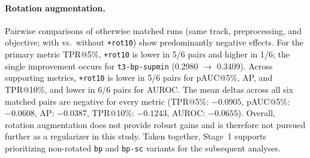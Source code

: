 \paragraph{Rotation augmentation.}
Pairwise comparisons of otherwise matched runs (same track, preprocessing, and objective; with vs.\ without \texttt{+rot10}) show predominantly negative effects.
For the primary metric TPR@5\%, \texttt{+rot10} is lower in 5/6 pairs and higher in 1/6; the single improvement occurs for \texttt{t3-bp-supmin} (0.2980 $\rightarrow$ 0.3409).
Across supporting metrics, \texttt{+rot10} is lower in 5/6 pairs for pAUC@5\%, AP, and TPR@10\%, and lower in 6/6 pairs for AUROC.
The mean deltas across all six matched pairs are negative for every metric (TPR@5\%: $-0.0905$, pAUC@5\%: $-0.0608$, AP: $-0.0387$, TPR@10\%: $-0.1243$, AUROC: $-0.0655$).
Overall, rotation augmentation does not provide robust gains and is therefore not pursued further as a regularizer in this study.
Taken together, Stage~1 supports prioritizing non-rotated \texttt{bp} and \texttt{bp-sc} variants for the subsequent analyses.


